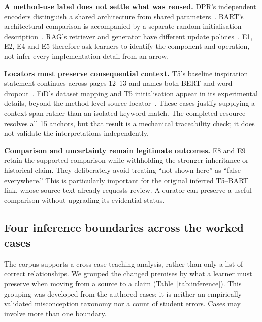\textbf{A method-use label does not settle what was reused.} DPR's independent encoders distinguish a shared architecture from shared parameters~\cite{dpr}. BART's architectural comparison is accompanied by a separate random-initialisation description~\cite{bart}. RAG's retriever and generator have different update policies~\cite{rag}. E1, E2, E4 and E5 therefore ask learners to identify the component and operation, not infer every implementation detail from an arrow.

\textbf{Locators must preserve consequential context.} T5's baseline inspiration statement continues across pages 12--13 and names both BERT and word dropout~\cite{t5}. FiD's dataset mapping and T5 initialisation appear in its experimental details, beyond the method-level source locator~\cite{fid}. These cases justify supplying a context span rather than an isolated keyword match. The completed resource resolves all 15 anchors, but that result is a mechanical traceability check; it does not validate the interpretations independently.

\textbf{Comparison and uncertainty remain legitimate outcomes.} E8 and E9 retain the supported comparison while withholding the stronger inheritance or historical claim. They deliberately avoid treating ``not shown here'' as ``false everywhere.'' This is particularly important for the original inferred T5--BART link, whose source text already requests review. A curator can preserve a useful comparison without upgrading its evidential status.

\subsection{Four inference boundaries across the worked cases}
The corpus supports a cross-case teaching analysis, rather than only a list of correct relationships. We grouped the changed premises by what a learner must preserve when moving from a source to a claim (Table~\ref{tab:inference}). This grouping was developed from the authored cases; it is neither an empirically validated misconception taxonomy nor a count of student errors. Cases may involve more than one boundary.

